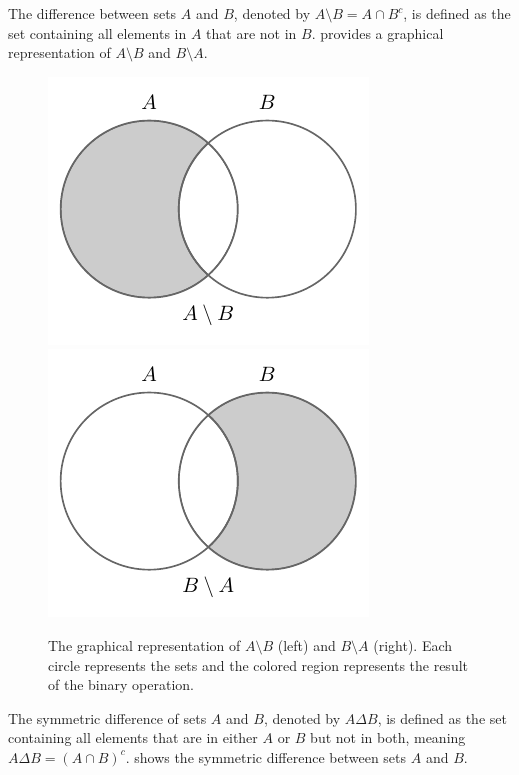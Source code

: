 \begin{definition}[Difference]
	The difference between sets $A$ and $B$, denoted by $A \setminus B = A\cap B^c$, is defined as the set containing all elements in $A$ that are not in $B$.  provides a graphical representation of $A\setminus B$ and $B\setminus A$.
	\begin{figure}[H]
		\centering
		\includegraphics[]{figures/set_minus.pdf}
		\includegraphics[]{figures/set_minus2.pdf}
		\caption{The graphical representation of $A\setminus B$ (left) and $B\setminus A$ (right). Each circle represents the sets and the colored region represents the result of the binary operation.}
		\label{fig:set_minus}
	\end{figure}
\end{definition}

\begin{definition}
	The symmetric difference of sets $A$ and $B$, denoted by $A \Delta B$, is defined as the set containing all elements that are in either $A$ or $B$ but not in both, meaning $A \Delta B = (A \cap B)^c$.  shows the symmetric difference between sets $A$ and $B$.
\end{definition}




